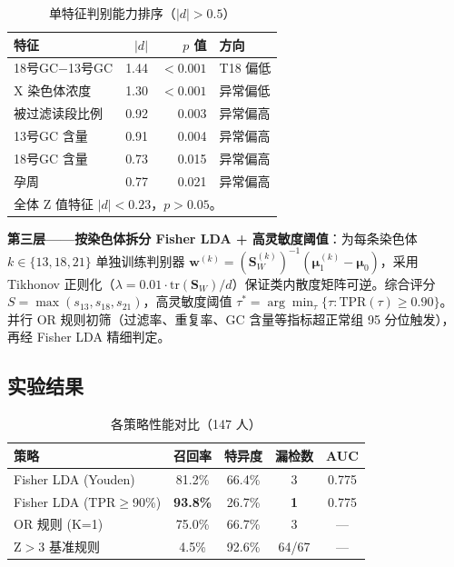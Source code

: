 \documentclass{mcm-paper}
\begin{document}
\begin{table}[H]
\centering
\caption{单特征判别能力排序（$|d|>0.5$）}
\label{tab:feature}
\begin{tabular}{lrrl}
\toprule
特征 & $|d|$ & $p$ 值 & 方向 \\
\midrule
18号GC$-$13号GC & 1.44 & $<0.001$ & T18 偏低 \\
X 染色体浓度    & 1.30 & $<0.001$ & 异常偏低 \\
被过滤读段比例  & 0.92 & 0.003  & 异常偏高 \\
13号GC 含量    & 0.91 & 0.004  & 异常偏高 \\
18号GC 含量    & 0.73 & 0.015  & 异常偏高 \\
孕周            & 0.77 & 0.021  & 异常偏高 \\
\bottomrule
\multicolumn{4}{l}{\footnotesize 全体 Z 值特征 $|d|<0.23$，$p>0.05$。} \\
\end{tabular}
\end{table}

\textbf{第三层——按染色体拆分 Fisher LDA + 高灵敏度阈值}：为每条染色体 $k\in\{13,18,21\}$ 单独训练判别器 $\mathbf{w}^{(k)} = (\mathbf{S}_W^{(k)})^{-1} (\boldsymbol{\mu}_1^{(k)}-\boldsymbol{\mu}_0)$，采用 Tikhonov 正则化（$\lambda=0.01\cdot\mathrm{tr}(\mathbf{S}_W)/d$）保证类内散度矩阵可逆。综合评分 $S=\max(s_{13},s_{18},s_{21})$，高灵敏度阈值 $\tau^* = \arg\min_{\tau}\{\tau:\text{TPR}(\tau)\geq 0.90\}$。并行 OR 规则初筛（过滤率、重复率、GC 含量等指标超正常组 95 分位触发），再经 Fisher LDA 精细判定。

\subsection{实验结果}

\begin{table}[H]
\centering
\caption{各策略性能对比（147 人）}
\label{tab:perf}
\begin{tabular}{lcccc}
\toprule
策略 & 召回率 & 特异度 & 漏检数 & AUC \\
\midrule
Fisher LDA (Youden)       & 81.2\% & 66.4\% & 3 & 0.775 \\
Fisher LDA (TPR$\geq$90\%) & \textbf{93.8\%} & 26.7\% & \textbf{1} & 0.775 \\
OR 规则 (K=1)             & 75.0\% & 66.7\% & 3 & — \\
Z$>3$ 基准规则            & 4.5\% & 92.6\% & 64/67 & — \\
\bottomrule
\end{tabular}
\end{table}
\end{document}
